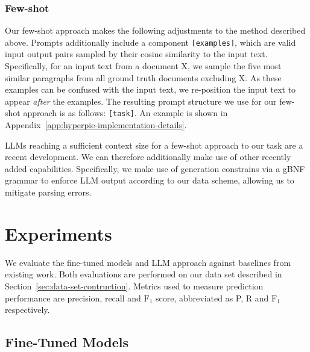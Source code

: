 \subsubsection{Few-shot} Our few-shot approach makes the following adjustments to the method described above. Prompts additionally include a component \texttt{[examples]}, which are valid input output pairs sampled by their cosine similarity to the input text. Specifically, for an input text from a document X, we sample the five most similar paragraphs from all ground truth documents excluding X. As these examples can be confused with the input text, we re-position the input text to appear \emph{after} the examples. The resulting prompt structure we use for our few-shot approach is as follows: \texttt{[task]\allowbreak[format]\allowbreak[examples]}.
An example is shown in Appendix~\ref{app:hyperpie-implementation-details}.

LLMs reaching a sufficient context size for a few-shot approach to our task are a recent development. We can therefore additionally make use of other recently added capabilities. Specifically, we make use of generation constrains via a gBNF grammar to enforce LLM output according to our data scheme, allowing us to mitigate parsing errors.

\section{Experiments}\label{sec:experiments}

We evaluate the fine-tuned models and LLM approach against baselines from existing work. Both evaluations are performed on our data set described in Section~\ref{sec:data-set-contruction}. Metrics used to measure prediction performance are precision, recall and $\text{F}_1$ score, abbreviated as P, R and $\text{F}_1$ respectively.

\subsection{Fine-Tuned Models}


